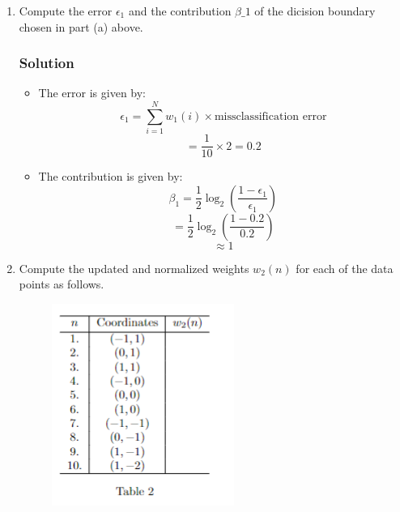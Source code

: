 \documentclass{article}
\begin{document}
\begin{enumerate}[label=\alph*)]
   \item Compute the error \(\epsilon_1\) and the contribution \(\beta\_1\) of the dicision boundary chosen in part (a) above.\\
   \subsubsection*{Solution}
   \begin{itemize}
      \item The error is given by:
      \[
      \epsilon_1 = \sum_{i=1}^{N} w_1(i) \times \text{missclassification error}
      \]
      \[
      = \frac{1}{10} \times 2 = 0.2
      \]
      \item The contribution is given by:
      \[
      \beta_1 = \frac{1}{2} \log_2(\frac{1 - \epsilon_1}{\epsilon_1})
      \]
      \[
      = \frac{1}{2} \log_2(\frac{1 - 0.2}{0.2})
      \]
      \[
      \approx 1
      \]
   \end{itemize}

   \item  Compute the updated and normalized weights \(w_2(n)\) for each of the data points as follows.\\
   \begin{figure}[H]
      \centering
      \includegraphics[width=0.5\linewidth]{image1.png}
  \end{figure}

\end{enumerate}
\end{document}
